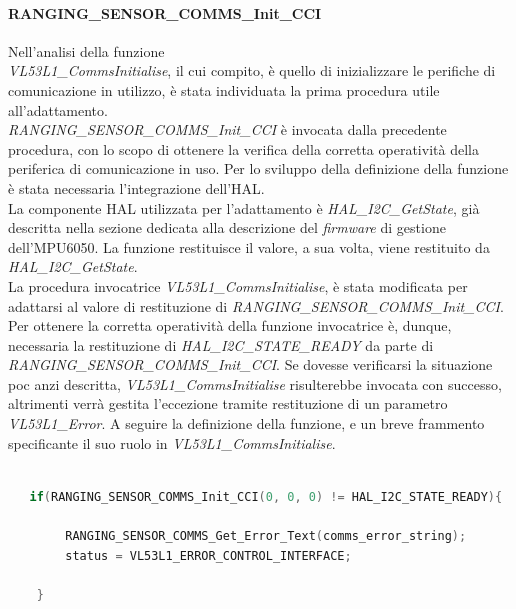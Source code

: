 \documentclass[11pt]{report}
\begin{document}
\paragraph{RANGING\_SENSOR\_COMMS\_Init\_CCI}
Nell'analisi della funzione\\\textit{VL53L1\_CommsInitialise}, il cui compito, è quello di inizializzare le perifiche di comunicazione in utilizzo, è stata individuata la prima procedura utile all'adattamento.\\
\textit{RANGING\_SENSOR\_COMMS\_Init\_CCI} è invocata dalla precedente procedura, con lo scopo di ottenere la verifica della corretta operatività della periferica di comunicazione in uso.
Per lo sviluppo della definizione della funzione è stata necessaria l'integrazione dell'HAL.\\
La componente HAL utilizzata per l'adattamento è \textit{HAL\_I2C\_GetState}, già descritta nella sezione dedicata alla descrizione del \textit{firmware} di gestione dell'MPU6050.
La funzione restituisce il valore, a sua volta, viene restituito da \textit{HAL\_I2C\_GetState}.\\
La procedura invocatrice \textit{VL53L1\_CommsInitialise}, è stata modificata per adattarsi al valore di restituzione di \textit{RANGING\_SENSOR\_COMMS\_Init\_CCI}.\\
Per ottenere la corretta operatività della funzione invocatrice è, dunque, necessaria la restituzione di \textit{HAL\_I2C\_STATE\_READY} da parte di \textit{RANGING\_SENSOR\_COMMS\_Init\_CCI}.
Se dovesse verificarsi la situazione poc anzi descritta, \textit{VL53L1\_CommsInitialise} risulterebbe invocata con successo, altrimenti verrà gestita l'eccezione tramite restituzione di un parametro \textit{VL53L1\_Error}.
A seguire la definizione della funzione, e un breve frammento specificante il suo ruolo in \textit{VL53L1\_CommsInitialise}.


\begin{lstlisting}[language=Cpp, caption={Dettaglio dell'implementazione di textit{RANGING\_SENSOR\_COMMS\_Init\_CCI} in \textit{VL53L1\_CommsInitialise}}]
    
   if(RANGING_SENSOR_COMMS_Init_CCI(0, 0, 0) != HAL_I2C_STATE_READY){

        RANGING_SENSOR_COMMS_Get_Error_Text(comms_error_string);
        status = VL53L1_ERROR_CONTROL_INTERFACE;

    }
\end{lstlisting}
\end{document}
